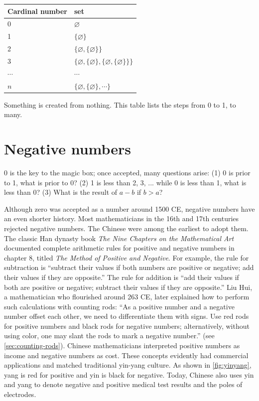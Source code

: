 \documentclass[b5paper]{article}
\begin{document}
\begin{tabular}{l|l}
  Cardinal number & set \\
  \hline
  0 & $\varnothing$ \\
  1 & $\{ \varnothing \}$ \\
  2 & $\{ \varnothing, \{ \varnothing \} \}$ \\
  3 & $\{ \varnothing, \{ \varnothing \}, \{ \varnothing, \{ \varnothing \} \}\}$ \\
  $\cdots$ & $\cdots$ \\
  $n$ & $\{ \varnothing, \{ \varnothing \}, \cdots \}$
\end{tabular}

Something is created from nothing. This table lists the steps from 0 to 1, to many.

\section{Negative numbers}

0 is the key to the magic box; once accepted, many questions arise: (1) 0 is prior to 1, what is prior to 0? (2) 1 is less than 2, 3, ... while 0 is less than 1, what is less than 0? (3) What is the result of $a - b$ if $b > a$?

 
Although zero was accepted as a number around 1500 CE, negative numbers have an even shorter history. Most mathematicians in the 16th and 17th centuries rejected negative numbers. The Chinese were among the earliest to adopt them. The classic Han dynasty book {\em The Nine Chapters on the Mathematical Art} documented complete arithmetic rules for positive and negative numbers in chapter 8, titled {\em The Method of Positive and Negative}. For example, the rule for subtraction is \enquote{subtract their values if both numbers are positive or negative; add their values if they are opposite.} The rule for addition is \enquote{add their values if both are positive or negative; subtract their values if they are opposite.} Liu Hui, a mathematician who flourished around 263 CE, later explained how to perform such calculations with counting rods: \enquote{As a positive number and a negative number offset each other, we need to differentiate them with signs. Use red rods for positive numbers and black rods for negative numbers; alternatively, without using color, one may slant the rods to mark a negative number.}\cite{Jiuzhang-2009} (see \cref{sec:counting-rods}). Chinese mathematicians interpreted positive numbers as income and negative numbers as cost. These concepts evidently had commercial applications and matched traditional yin-yang culture. As shown in \cref{fig:yinyang}, yang is red for positive and yin is black for negative. Today, Chinese also uses yin and yang to denote negative and positive medical test results and the poles of electrodes.
\end{document}
